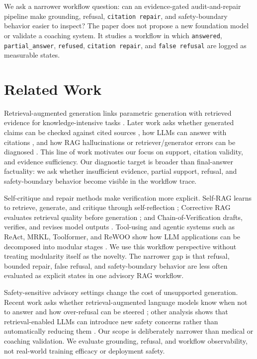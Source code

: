 \documentclass[runningheads,a4paper]{llncs}
\begin{document}
We ask a narrower workflow question: can an evidence-gated audit-and-repair pipeline make grounding, refusal, \texttt{citation repair}, and safety-boundary behavior easier to inspect? The paper does not propose a new foundation model or validate a coaching system. It studies a workflow in which \texttt{answered}, \texttt{partial\_answer}, \texttt{refused}, \texttt{citation repair}, and \texttt{false refusal} are logged as measurable states.

\section{Related Work}

Retrieval-augmented generation links parametric generation with retrieved evidence for knowledge-intensive tasks \cite{lewis2020rag}. Later work asks whether generated claims can be checked against cited sources \cite{liu2023verifiability}, how LLMs can answer with citations \cite{gao2023alce}, and how RAG hallucinations or retriever/generator errors can be diagnosed \cite{niu2023ragtruth,ragchecker2024}. This line of work motivates our focus on support, citation validity, and evidence sufficiency. Our diagnostic target is broader than final-answer factuality: we ask whether insufficient evidence, partial support, refusal, and safety-boundary behavior become visible in the workflow trace.

Self-critique and repair methods make verification more explicit. Self-RAG learns to retrieve, generate, and critique through self-reflection \cite{asai2023selfrag}; Corrective RAG evaluates retrieval quality before generation \cite{yan2024crag}; and Chain-of-Verification drafts, verifies, and revises model outputs \cite{dhuliawala2023cove}. Tool-using and agentic systems such as ReAct, MRKL, Toolformer, and ReWOO show how LLM applications can be decomposed into modular stages \cite{yao2022react,karpas2022mrkl,schick2023toolformer,xu2023rewoo}. We use this workflow perspective without treating modularity itself as the novelty. The narrower gap is that refusal, bounded repair, false refusal, and safety-boundary behavior are less often evaluated as explicit states in one advisory RAG workflow.

Safety-sensitive advisory settings change the cost of unsupported generation. Recent work asks whether retrieval-augmented language models know when not to answer and how over-refusal can be steered \cite{zhou2025ralmknow,maskey2025overrefusal}; other analysis shows that retrieval-enabled LLMs can introduce new safety concerns rather than automatically reducing them \cite{yu2025safetydegradation}. Our scope is deliberately narrower than medical or coaching validation. We evaluate grounding, refusal, and workflow observability, not real-world training efficacy or deployment safety.
\end{document}
